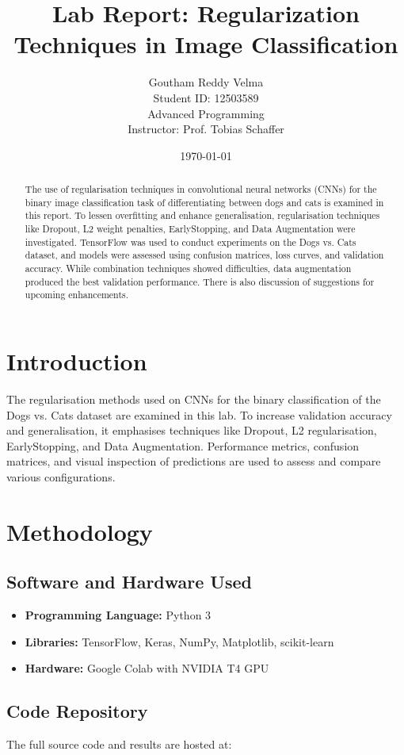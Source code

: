 \documentclass{article}
\title{Lab Report: Regularization Techniques in Image Classification}
\author{Goutham Reddy Velma \\ Student ID: 12503589 \\ Advanced Programming \\ Instructor: Prof. Tobias Schaffer}
\date{\today}
\begin{document}
\maketitle

\begin{abstract}
The use of regularisation techniques in convolutional neural networks (CNNs) for the binary image classification task of differentiating between dogs and cats is examined in this report. To lessen overfitting and enhance generalisation, regularisation techniques like Dropout, L2 weight penalties, EarlyStopping, and Data Augmentation were investigated. TensorFlow was used to conduct experiments on the Dogs vs. Cats dataset, and models were assessed using confusion matrices, loss curves, and validation accuracy. While combination techniques showed difficulties, data augmentation produced the best validation performance. There is also discussion of suggestions for upcoming enhancements.
\end{abstract}

\section{Introduction}
The regularisation methods used on CNNs for the binary classification of the Dogs vs. Cats dataset are examined in this lab. To increase validation accuracy and generalisation, it emphasises techniques like Dropout, L2 regularisation, EarlyStopping, and Data Augmentation. Performance metrics, confusion matrices, and visual inspection of predictions are used to assess and compare various configurations.

\section{Methodology}

\subsection{Software and Hardware Used}
\begin{itemize}
    \item \textbf{Programming Language:} Python 3
    \item \textbf{Libraries:} TensorFlow, Keras, NumPy, Matplotlib, scikit-learn
    \item \textbf{Hardware:} Google Colab with NVIDIA T4 GPU
\end{itemize}

\subsection{Code Repository}
The full source code and results are hosted at:
\end{document}

